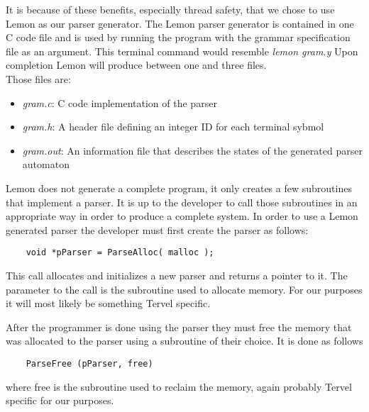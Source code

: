 \documentclass[letterpaper]{article}
\begin{document}
It is because of these benefits, especially thread safety, that we chose to use Lemon
as our parser generator. The Lemon parser generator is contained in one C code file and
is used by running the program with the grammar specification file as an argument.
This terminal command would resemble \textit{lemon gram.y} 
Upon completion Lemon will produce between one and three files.\\ Those files are:
\begin{itemize}
	\item \textit{gram.c}: C code implementation of the parser
	\item \textit{gram.h}: A header file defining an integer ID for each terminal sybmol
	\item \textit{gram.out}: An information file that describes the states of the
	generated parser automaton
\end{itemize}
Lemon does not generate a complete program, it only creates a few subroutines that
implement a parser. It is up to the developer to call those subroutines in an appropriate
way in order to produce a complete system. In order to use a Lemon generated parser the
developer must first create the parser as follows: 
\begin{lstlisting} 
	void *pParser = ParseAlloc( malloc );
\end{lstlisting}
This call allocates and initializes a new parser and returns a pointer to it. The
parameter to the call is the subroutine used to allocate memory. For our purposes it will
most likely be something Tervel specific.

After the programmer is done using the parser they must free the memory that was allocated
to the parser using a subroutine of their choice. It is done as follows
\begin{lstlisting}
	ParseFree (pParser, free) 
\end{lstlisting}
where free is the subroutine used to reclaim the memory, again probably Tervel specific for our purposes. 
\end{document}
